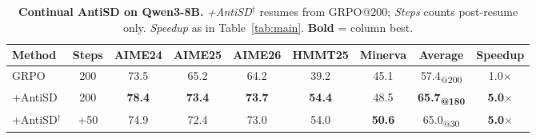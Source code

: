 \begin{table}[ht]
  \caption{\textbf{Continual AntiSD on Qwen3-8B.} \emph{+AntiSD$^{\dag}$} resumes from GRPO@$200$; \emph{Steps} counts post-resume only. \emph{Speedup} as in Table~\ref{tab:main}. \textbf{Bold} = column best.}
  \vspace{-0.5em}
  \label{tab:continual}
  \centering
  \small
  \setlength{\tabcolsep}{5pt}
  \renewcommand{\arraystretch}{0.95}
  \begin{tabular}{l|c|ccccc|c|c}
    \toprule
    \textbf{Method}                       & \textbf{Steps} & \textbf{AIME24} & \textbf{AIME25} & \textbf{AIME26} & \textbf{HMMT25} & \textbf{Minerva} & \textbf{Average}                  & \textbf{Speedup}     \\
    \midrule
    GRPO                                  & 200            & 73.5            & 65.2            & 64.2            & 39.2            & 45.1             & 57.4\textsubscript{@200}          & 1.0$\times$          \\
    +AntiSD                               & 200            & \textbf{78.4}   & \textbf{73.4}   & \textbf{73.7}   & \textbf{54.4}   & 48.5             & \textbf{65.7\textsubscript{@180}} & \textbf{5.0$\times$} \\
    \rowcolor{antisdrow} +AntiSD$^{\dag}$ & +50            & 74.9            & 72.4            & 73.0            & 54.0            & \textbf{50.6}    & 65.0\textsubscript{@30}           & \textbf{5.0$\times$} \\
    \bottomrule
  \end{tabular}
  \vspace{-.5em}
\end{table}
